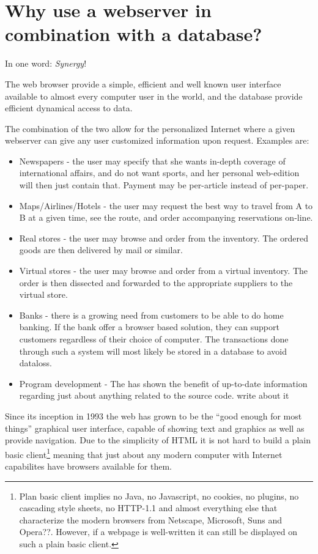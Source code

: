 \section{Why use a webserver in combination with a database?}
\label{sec:why-use-a-webserver-in-combination-with-a-database}

In one word: \textit{Synergy}!

The web browser provide a simple, efficient and
well known user interface available to almost every computer user in
the world, and the database provide efficient dynamical access to
data.

The combination of the two allow for the personalized Internet where a
given webserver can give any user customized information upon request.
Examples are:

\begin{itemize}
\item Newspapers - the user may specify that she wants in-depth
  coverage of international affairs, and do not want sports, and her
  personal web-edition will then just contain that.  Payment may be
  per-article instead of per-paper.
\item Maps/Airlines/Hotels - the user may request the best way to
travel from A to B at a given time, see the route, and order
accompanying reservations on-line.
\item Real stores - the user may browse and order from the inventory.
  The ordered goods are then delivered by mail or similar.
\item Virtual stores - the user may browse and order from a virtual
  inventory.  The order is then dissected and forwarded to the
  appropriate suppliers to the virtual store.

\item Banks - there is a growing need from customers to be able to do
  home banking.  If the bank offer a browser based solution, they can
  support customers regardless of their choice of computer.  The
  transactions done through such a system will most likely be stored
  in a database to avoid dataloss.
\item Program development - The  has shown the benefit of up-to-date information regarding
  just about anything related to the source code.  \textsf{write about
    it}
\end{itemize}


Since its inception in 1993 the web has grown to be the ``good enough
for most things'' graphical user interface, capable of showing text
and graphics as well as provide navigation.  Due to the simplicity of
HTML it is not hard to build a plain basic client\footnote{Plan basic
  client implies no Java, no Javascript, no cookies, no plugins, no
  cascading style sheets, no HTTP-1.1 and almost everything else that
  characterize the modern browsers from Netscape, Microsoft, Suns and
  Opera\textsf{??}.  However, if a webpage is well-written it can still
  be displayed on such a plain basic client. } meaning that just about
any modern computer with Internet capabilites have browsers available
for them.



